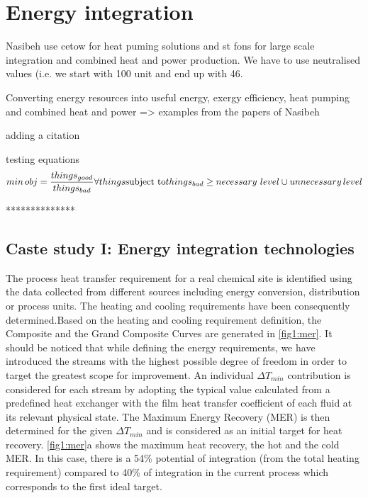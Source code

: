 \section{Energy integration}


Nasibeh use cetow for heat puming solutions and st fons for large scale integration and combined heat and power production. We have to use neutralised values (i.e. we start with 100 unit and end up with 46.


Converting energy resources into useful energy, exergy efficiency, heat pumping and combined heat and power => examples from the papers of Nasibeh

adding a citation \cite{Pouransari_2014}

testing equations
\begin{equation}
min \, obj= \frac{things_{good}}{things_{bad}} \forall things\\
\text{subject to}  \\
things_{bad}\ge necessary\,\, level \cup unnecessary \, level
\end{equation}

**************

\subsection{Caste study I: Energy integration technologies}

The process heat transfer requirement for a real chemical site is identified using the data collected from different sources including energy conversion, distribution or process units. The heating and cooling requirements have been consequently determined.Based on the heating and cooling requirement definition, the Composite and the Grand Composite Curves are generated in \cref{fig1:mer}. It should be noticed that while defining the energy requirements, we have introduced the streams with the highest possible degree of freedom in order to target the greatest scope for improvement. An individual $\Delta T_{min}$ contribution is considered for each stream by adopting the typical value calculated from a predefined heat exchanger with the film heat transfer coefficient of each fluid at its relevant physical state. The Maximum Energy Recovery (MER) is then determined for the given $\Delta T_{min}$ and is considered as an initial target for heat recovery. \cref{fig1:mer}a shows the maximum heat recovery, the hot and the cold MER. In this case, there is a 54\% potential of integration (from the total heating requirement) compared to 40\% of integration in the current process which corresponds to the first ideal target.


